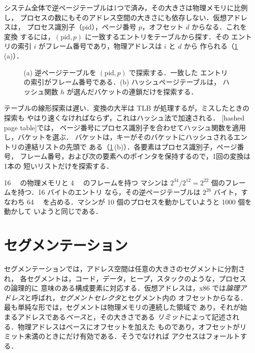 \documentclass[../main.tex]{subfiles}
\begin{document}
システム全体で逆ページテーブルは1つで済み，その大きさは物理メモリに比例し，
プロセスの数にもそのアドレス空間の大きさにも依存しない．仮想アドレスは，
プロセス識別子（pid），ページ番号 $p$，オフセット $d$ からなる．これを変換
するには，$(\text{pid}, p)$ に一致するエントリをテーブルから探す．その
エントリの索引 $i$ がフレーム番号であり，物理アドレスは $i$ と $d$ から
作られる（\cref{fig:l08-inverted}\,(a)）．

\begin{figure}[htbp]
  \centering
  
  \caption{(a) 逆ページテーブルを $(\text{pid}, p)$ で探索する．一致した
    エントリの索引がフレーム番号である．(b) ハッシュページテーブルは，
    ハッシュ関数 $h$ が選んだバケットの連鎖だけを探索する．}
  \label{fig:l08-inverted}
\end{figure}

テーブルの線形探索は遅い．変換の大半は TLB が処理するが，ミスしたときの探索も
やはり速くなければならず，これはハッシュ法で加速される．
[hashed page table]では，
ページ番号にプロセス識別子を合わせてハッシュ関数を適用し，バケットを選ぶ．
バケットは，キーがそのバケットにハッシュされるエントリの連結リストの先頭で
ある（\cref{fig:l08-inverted}\,(b)）．各要素はプロセス識別子，ページ番号，
フレーム番号，および次の要素へのポインタを保持するので，1回の変換は1本の
短いリストだけを探索する．

\begin{example}
  \SI{16}{\gibi\byte} の物理メモリと \SI{4}{\kibi\byte} のフレームを持つ
  マシンは $2^{34}/2^{12} = 2^{22}$ 個のフレームを持つ．16 バイトのエントリ
  なら，その逆ページテーブルは $2^{26}$ バイト，すなわち \SI{64}{\mebi\byte}
  を占める．マシンが 10 個のプロセスを動かしていようと 1000 個を動かして
  いようと同じである．
\end{example}

\section{セグメンテーション}
\label{sec:l08-segmentation}

セグメンテーションでは，アドレス空間は任意の大きさのセグメントに分割され，
各セグメントは，コード，データ，ヒープ，スタックのような，プロセスの論理的に
意味のある構成要素に対応する．仮想アドレスは，x86
では\emph{論理アドレス}と呼ばれ，\emph{セグメントセレクタ}とセグメント内の
オフセットからなる．最も単純な形では，セグメントは物理メモリの連続した領域で
あり，それが始まるアドレスである\emph{ベース}と，その大きさである
\emph{リミット}によって記述される．物理アドレスはベースにオフセットを加えた
ものであり，オフセットがリミット未満のときにだけ有効である．そうでなければ
アクセスはフォールトする．
\end{document}

